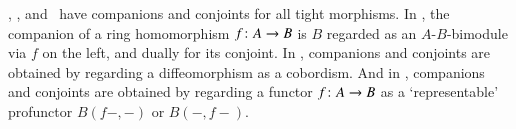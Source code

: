 

\begin{egs}
  \lMod, \lnCob, and \lProf\ have companions and conjoints for all tight morphisms.  In \lMod, the companion
  of a ring homomorphism $f\colon A\to B$ is $B$ regarded as an
  $A$-$B$-bimodule via $f$ on the left, and dually for its conjoint.
  In \lnCob, companions and conjoints are obtained by regarding a
  diffeomorphism as a cobordism.  And in \lProf, companions and
  conjoints are obtained by regarding a functor $f\colon A\to B$ as a
  `representable' profunctor $B(f-,-)$ or $B(-,f-)$.
\end{egs}

